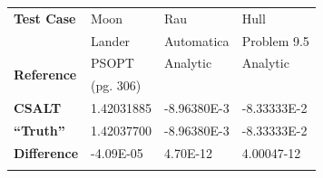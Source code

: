 \documentclass[ISTS  ]{tjsass} %
\newcommand{\bhline}[1]{\noalign{\hrule height #1}}
\begin{document}
\begin{table}
\begin{tabularx}{\columnwidth}{lXXX}
        \textbf{Test Case}  & Moon                         & Rau                                   & Hull                    \\
                            & Lander                       & Automatica                            & Problem 9.5             \\\hline
        \multirow{2}{*}{\textbf{Reference}} & PSOPT                        & Analytic                              & Analytic                \\
                            & (pg. 306)                    &                                       &                         \\
        \textbf{CSALT}      & 1.42031885                   & -8.96380E-3                           & -8.33333E-2              \\
        \textbf{``Truth''}  & 1.42037700                   & -8.96380E-3                           & -8.33333E-2                     \\
        \textbf{Difference} & -4.09E-05                    & 4.70E-12                              & 4.00047-12                   \\\bhline{.8pt}
	\end{tabularx}
\end{table}
%
\end{document}
